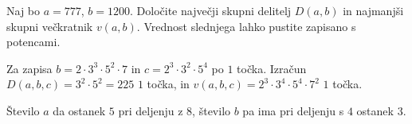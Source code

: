 \documentclass[addpoints]{exam}
\begin{document}
\begin{questions}


    \question[4]
    Naj bo $a=777$, $b=1200$. 
    Določite največji skupni delitelj $D(a,b)$ in najmanjši skupni večkratnik $v(a,b)$. Vrednost slednjega lahko pustite zapisano s potencami.

    \begin{solution}
        Za zapisa $b=2\cdot 3^3\cdot 5^2\cdot 7$ in $c=2^3\cdot 3^2\cdot 5^4$ po $1$ točka. 
        Izračun $D(a,b,c)=3^2\cdot 5^2=225$ $1$ točka, in $v(a,b,c)=2^3\cdot 3^4\cdot 5^4\cdot 7^2$ $1$ točka.
    \end{solution}
    
    
    \question
    Število $a$ da ostanek $5$ pri deljenju z $8$, število $b$ pa ima pri deljenju s $4$ ostanek $3$.





    



\end{questions}
\end{document}
